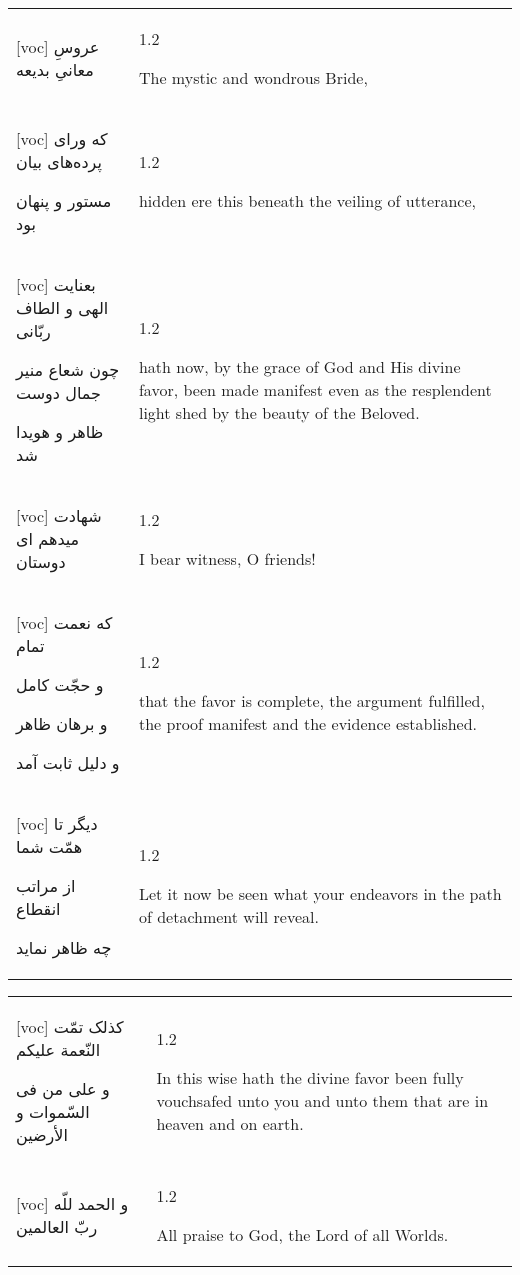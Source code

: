 \documentclass[11pt]{article}
\makeatletter
\newenvironment{orig}
  {\begin{farsi}[voc]}
  {\end{farsi}}
\newenvironment{trans}
  {\Large\begin{spacing}{1.2}\raggedright}
  {\end{spacing}}
\newenvironment{word}
  {\begin{tabular}[t]{p{2.75in}@{\hspace{3em}}p{2.75in}}}
  {\end{tabular}}
\newcommand{\ayat}[2]{\begin{orig}#1\end{orig} & \begin{trans}#2\end{trans}}
\makeatother
\begin{document}
\pagebreak

\begin{word}
\ayat{
عروسِ معانیِ بديعه
}{The mystic and wondrous Bride,} \vspace{-1ex}\\ \ayat{
که ورای پرده‌های بيان

مستور و پنهان بود
}{hidden ere this beneath the veiling of utterance,} \vspace{-1ex}\\ \ayat{
بعنايت الهی و الطاف ربّانی

چون شعاع منير جمال دوست

ظاهر و هويدا شد
}{hath now, by the grace of God and His divine favor, been made manifest
  even as the resplendent light shed by the beauty of the Beloved.} \vspace{-1ex}\\ \ayat{
شهادت ميدهم ای دوستان
}{I bear witness, O friends!} \vspace{-1ex}\\ \ayat{
که نعمت تمام

و حجّت کامل

و برهان ظاهر

و دليل ثابت آمد
}{that the favor is complete, the argument fulfilled, the proof manifest
  and the evidence established.} \\ \ayat{
ديگر تا همّت شما

از مراتب انقطاع

چه ظاهر نمايد
}{Let it now be seen what your endeavors in the path of detachment will
  reveal.}
\end{word}

\pagebreak

\begin{word}
\ayat{
کذلک تمّت النّعمة عليکم

و علی من فی السّموات و الأرضين
}{In this wise hath the divine favor been fully vouchsafed unto you and
  unto them that are in heaven and on earth.} \vspace{-1ex}\\ \ayat{
و الحمد للّه ربّ العالمين
}{All praise to God, the Lord of all Worlds.}
\end{word}
\end{document}
